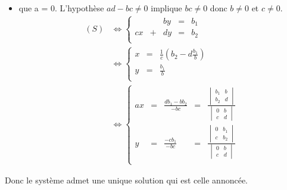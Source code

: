 \documentclass{article}
\renewenvironment{question_kholle}[2][ ]
{
	\subsection{\texorpdfstring{#2}{}}
	\notblank{#1}
	{
		\noindent #1
		\bigbreak
	}
	{}
	\begin{proof}
}
{
	\end{proof}
}
\begin{document}
\begin{question_kholle}
\begin{itemize}[label=$\bullet$ Supposons]
\begin{itemize}[label=$\bullet$ Supposons]
				\item que a = 0. L'hypothèse $ad - bc \neq 0$ implique $bc \neq 0$ donc $b \neq 0$ et $c \neq 0$.
				\begin{equation*}
					\begin{aligned}
						(S)
						&\iff \left\{
						\begin{array}{ccccc}
							&& by &=& b_1 \\
							cx &+& dy &=&  b_2 \\
						\end{array}
						\right. \\
						&\iff \left\{
						\begin{array}{ccc}
							x &=&  \frac{1}{c} \left( b_2 - d\frac{b_1}{b} \right) \\
							y &=& \frac{b_1}{b} \\
						\end{array}
						\right. \\
						&\iff \left\{
						\begin{array}{ccccc}
							ax &=& \frac{db_1 - bb_2}{- bc} &=& \frac{\begin{vmatrix}b_1&b\\b_2&d\end{vmatrix}}{\begin{vmatrix}0&b\\c&d\end{vmatrix}} \\
							y &=& \frac{- cb_1}{- bc} &=& \frac{\begin{vmatrix}0&b_1\\c&b_2\end{vmatrix}}{\begin{vmatrix}0&b\\c&d\end{vmatrix}}\\
						\end{array}
						\right.
					\end{aligned}
				\end{equation*}
			\end{itemize}
			Donc le système admet une unique solution qui est celle annoncée.
		\end{itemize}


\end{question_kholle}
\end{document}
